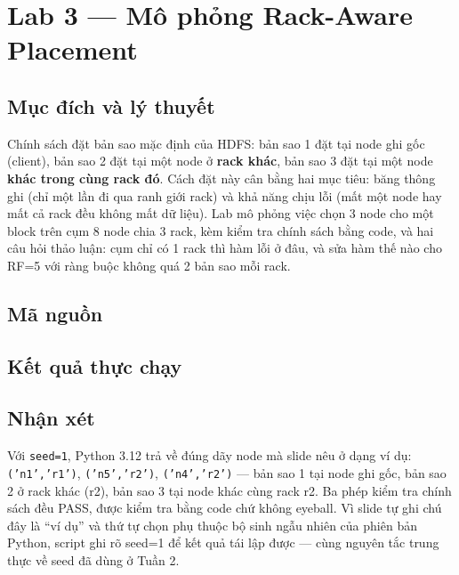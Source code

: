 \documentclass[12pt,a4paper,oneside]{article}
\begin{document}
\section{Lab 3 --- Mô phỏng Rack-Aware Placement}
\label{sec:lab3}

\subsection{Mục đích và lý thuyết}

Chính sách đặt bản sao mặc định của HDFS: bản sao 1 đặt tại node ghi gốc (client), bản sao 2 đặt tại một node ở \textbf{rack khác}, bản sao 3 đặt tại một node \textbf{khác trong cùng rack đó}. Cách đặt này cân bằng hai mục tiêu: băng thông ghi (chỉ một lần đi qua ranh giới rack) và khả năng chịu lỗi (mất một node hay mất cả rack đều không mất dữ liệu). Lab mô phỏng việc chọn 3 node cho một block trên cụm 8 node chia 3 rack, kèm kiểm tra chính sách bằng code, và hai câu hỏi thảo luận: cụm chỉ có 1 rack thì hàm lỗi ở đâu, và sửa hàm thế nào cho RF=5 với ràng buộc không quá 2 bản sao mỗi rack.

\subsection{Mã nguồn}



\subsection{Kết quả thực chạy}



\subsection{Nhận xét}

Với \texttt{seed=1}, Python 3.12 trả về đúng dãy node mà slide nêu ở dạng ví dụ: \texttt{('n1','r1')}, \texttt{('n5','r2')}, \texttt{('n4','r2')} --- bản sao 1 tại node ghi gốc, bản sao 2 ở rack khác (r2), bản sao 3 tại node khác cùng rack r2. Ba phép kiểm tra chính sách đều PASS, được kiểm tra bằng code chứ không eyeball. Vì slide tự ghi chú đây là ``ví dụ'' và thứ tự chọn phụ thuộc bộ sinh ngẫu nhiên của phiên bản Python, script ghi rõ seed=1 để kết quả tái lập được --- cùng nguyên tắc trung thực về seed đã dùng ở Tuần 2.
\end{document}
